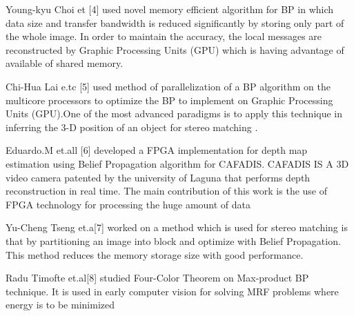 {{{{{{{{{{{Young-kyu Choi et [4] used novel memory efficient algorithm for BP in which data size and transfer bandwidth is reduced significantly by storing only part of the whole image.
In order to maintain the accuracy, the local messages are reconstructed by Graphic Processing Units (GPU) which is having advantage of available of shared memory.



Chi-Hua Lai e.tc [5] used  method of  parallelization of a BP algorithm on the multicore processors  to optimize the BP  to implement on Graphic Processing Units (GPU).One of the most advanced paradigms is to apply this  technique in inferring the 3-D position of an object for stereo matching .


 Eduardo.M et.all [6] developed a FPGA implementation for depth map estimation using Belief Propagation algorithm for CAFADIS. CAFADIS IS A 3D video camera  patented  by the university of Laguna that performs depth reconstruction in real time.
The main contribution of this work is the use of FPGA technology for processing the huge amount of data



Yu-Cheng Tseng et.a[7]  worked on  a method which is  used  for stereo matching is that by partitioning an image into block and optimize with Belief Propagation. This method reduces the memory storage size with good performance.





Radu  Timofte et.al[8] studied Four-Color Theorem  on Max-product BP technique. It is used in early computer vision for solving MRF problems where energy is to be minimized

}}}}}}}}}}}

